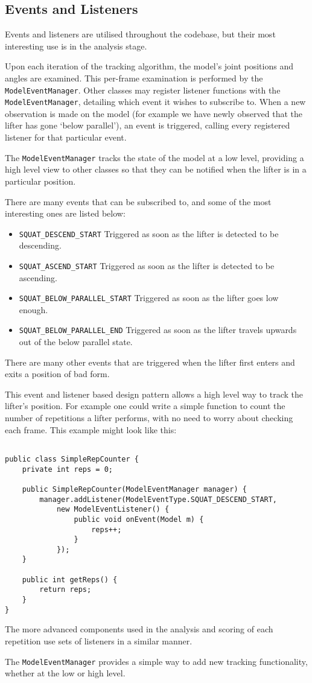 \subsection{Events and Listeners}
\label{sec:listeners}

Events and listeners are utilised throughout the codebase, but their most interesting use is in the analysis stage.

Upon each iteration of the tracking algorithm, the model's joint positions and angles are examined. This per-frame examination is performed by the \verb!ModelEventManager!. Other classes may register listener functions with the \verb!ModelEventManager!, detailing which event it wishes to subscribe to. When a new observation is made on the model (for example we have newly observed that the lifter has gone `below parallel'), an event is triggered, calling every registered listener for that particular event.

The \verb!ModelEventManager! tracks the state of the model at a low level, providing a high level view to other classes so that they can be notified when the lifter is in a particular position.

There are many events that can be subscribed to, and some of the most interesting ones are listed below:

\begin{itemize}
	\item \verb!SQUAT_DESCEND_START! Triggered as soon as the lifter is detected to be descending.
	\item \verb!SQUAT_ASCEND_START! Triggered as soon as the lifter is detected to be ascending.
	\item \verb!SQUAT_BELOW_PARALLEL_START! Triggered as soon as the lifter goes low enough.
	\item \verb!SQUAT_BELOW_PARALLEL_END! Triggered as soon as the lifter travels upwards out of the below parallel state.
\end{itemize}

There are many other events that are triggered when the lifter first enters and exits a position of bad form.

This event and listener based design pattern allows a high level way to track the lifter's position. For example one could write a simple function to count the number of repetitions a lifter performs, with no need to worry about checking each frame. This example might look like this:

\begin{lstlisting}[style=javastyle]

public class SimpleRepCounter {
	private int reps = 0;

	public SimpleRepCounter(ModelEventManager manager) {
		manager.addListener(ModelEventType.SQUAT_DESCEND_START,
			new ModelEventListener() {
				public void onEvent(Model m) {
					reps++;
				}
			});
	}

	public int getReps() {
		return reps;
	}
}

\end{lstlisting}

The more advanced components used in the analysis and scoring of each repetition use sets of listeners in a similar manner.

The \verb!ModelEventManager! provides a simple way to add new tracking functionality, whether at the low or high level.